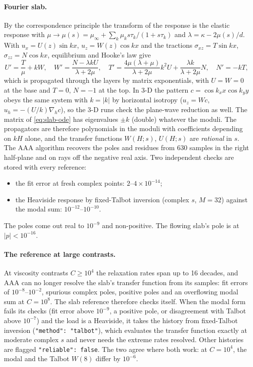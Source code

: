 \documentclass[11pt]{article}
\numberwithin{equation}{section}
\newcommand{\code}[1]{\texttt{#1}}
\begin{document}
\paragraph{Fourier slab.}
By the correspondence principle the transform of the response is the
elastic response with $\mu\to\mu(s)=\mu_\infty+\sum_k\mu_ks\tau_k/(1+s\tau_k)$
and $\lambda=\kappa-2\mu(s)/d$. With $u_x=U(z)\sin kx$, $u_z=W(z)\cos kx$
and the tractions $\sigma_{xz}=T\sin kx$, $\sigma_{zz}=N\cos kx$,
equilibrium and Hooke's law give
\begin{equation}
  U'=\frac{T}{\mu}+kW,\quad
  W'=\frac{N-\lambda kU}{\lambda+2\mu},\quad
  T'=\frac{4\mu(\lambda+\mu)}{\lambda+2\mu}k^2U+\frac{\lambda k}{\lambda+2\mu}N,\quad
  N'=-kT,
  \label{eq:slab-ode}
\end{equation}
which is propagated through the layers by matrix exponentials, with
$U=W=0$ at the base and $T=0$, $N=-1$ at the top. In 3-D the pattern
$c=\cos k_xx\cos k_yy$ obeys the same system with $k=|k|$ by horizontal
isotropy ($u_z=Wc$, $u_h=-(U/k)\nabla_hc$), so the 3-D runs check the
plane-wave reduction as well. The matrix of \eqref{eq:slab-ode} has
eigenvalues $\pm k$ (double) whatever the moduli. The propagators are
therefore polynomials in the moduli with coefficients depending on $kH$
alone, and the transfer functions $W(H;s)$, $U(H;s)$ are \emph{rational}
in $s$. The AAA algorithm \cite{AAA2018} recovers the poles and residues
from 630 samples in the right half-plane and on rays off the negative real
axis. Two independent checks are stored with every reference:
\begin{itemize}[leftmargin=*]
\item the fit error at fresh complex points: $2$--$4\times10^{-14}$;
\item the Heaviside response by fixed-Talbot inversion \cite{AbateValko2004}
  (complex $s$, $M=32$) against the modal sum: $10^{-12}$--$10^{-10}$.
\end{itemize}
The poles come out real to $10^{-9}$ and non-positive. The flowing slab's
pole is at $|p|<10^{-16}$.

\paragraph{The reference at large contrasts.}
At viscosity contrasts $C\ge10^4$ the relaxation rates span up to 16
decades, and AAA can no longer resolve the slab's transfer function from
its samples: fit errors of $10^{-8}$--$10^{-2}$, spurious complex poles,
positive poles and an overflowing modal sum at $C=10^8$. The slab
reference therefore checks itself. When the modal form fails its checks
(fit error above $10^{-9}$, a positive pole, or disagreement with Talbot
above $10^{-7}$) and the load is a Heaviside, it takes the history from
fixed-Talbot inversion (\code{"method": "talbot"}), which evaluates the
transfer function exactly at moderate complex $s$ and never needs the
extreme rates resolved. Other histories are flagged
\code{"reliable": false}. The two agree where both work: at $C=10^4$, the
modal and the Talbot $W(8)$ differ by $10^{-6}$.
\end{document}
